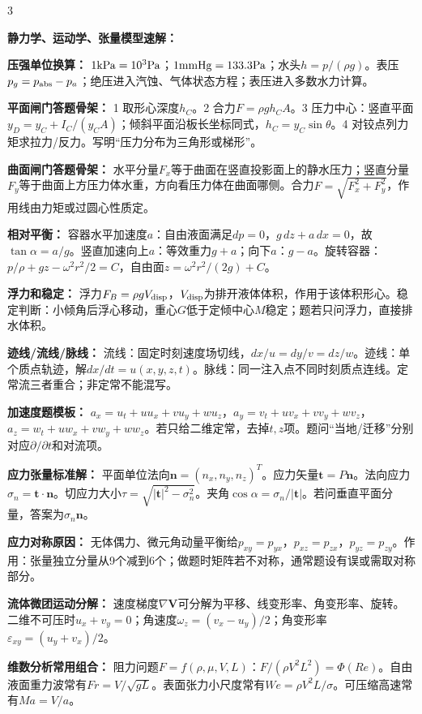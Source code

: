 \documentclass[a4paper]{article}
\newcommand{\sect}[1]{\par{\bfseries\color{Q}#1：}}
\begin{document}
\begin{multicols}{3}
{\sect{静力学、运动学、张量模型速解}
\sect{压强单位换算}
$1{\rm kPa}=10^3{\rm Pa}$；$1{\rm mmHg}=133.3{\rm Pa}$；水头$h=p/(\rho g)$。表压$p_g=p_{\rm abs}-p_a$；绝压进入汽蚀、气体状态方程；表压进入多数水力计算。
\sect{平面闸门答题骨架}
1 取形心深度$h_C$。2 合力$F=\rho gh_CA$。3 压力中心：竖直平面$y_D=y_C+I_C/(y_CA)$；倾斜平面沿板长坐标同式，$h_C=y_C\sin\theta$。4 对铰点列力矩求拉力/反力。写明“压力分布为三角形或梯形”。
\sect{曲面闸门答题骨架}
水平分量$F_x$等于曲面在竖直投影面上的静水压力；竖直分量$F_y$等于曲面上方压力体水重，方向看压力体在曲面哪侧。合力$F=\sqrt{F_x^2+F_y^2}$，作用线由力矩或过圆心性质定。
\sect{相对平衡}
容器水平加速度$a$：自由液面满足$dp=0$，$g\,dz+a\,dx=0$，故$\tan\alpha=a/g$。竖直加速向上$a$：等效重力$g+a$；向下$a$：$g-a$。旋转容器：$p/\rho+gz-\omega^2r^2/2=C$，自由面$z=\omega^2r^2/(2g)+C$。
\sect{浮力和稳定}
浮力$F_B=\rho gV_{\rm disp}$，$V_{\rm disp}$为排开液体体积，作用于该体积形心。稳定判断：小倾角后浮心移动，重心$G$低于定倾中心$M$稳定；题若只问浮力，直接排水体积。
\sect{迹线/流线/脉线}
流线：固定时刻速度场切线，$dx/u=dy/v=dz/w$。迹线：单个质点轨迹，解$dx/dt=u(x,y,z,t)$。脉线：同一注入点不同时刻质点连线。定常流三者重合；非定常不能混写。
\sect{加速度题模板}
$a_x=u_t+uu_x+vu_y+wu_z$，$a_y=v_t+uv_x+vv_y+wv_z$，$a_z=w_t+uw_x+vw_y+ww_z$。若只给二维定常，去掉$t,z$项。题问“当地/迁移”分别对应$\partial/\partial t$和对流项。
\sect{应力张量标准解}
平面单位法向$\bm n=(n_x,n_y,n_z)^T$。应力矢量$\bm t=P\bm n$。法向应力$\sigma_n=\bm t\cdot\bm n$。切应力大小$\tau=\sqrt{|\bm t|^2-\sigma_n^2}$。夹角$\cos\alpha=\sigma_n/|\bm t|$。若问垂直平面分量，答案为$\sigma_n\bm n$。
\sect{应力对称原因}
无体偶力、微元角动量平衡给$p_{xy}=p_{yx}$，$p_{xz}=p_{zx}$，$p_{yz}=p_{zy}$。作用：张量独立分量从9个减到6个；做题时矩阵若不对称，通常题设有误或需取对称部分。
\sect{流体微团运动分解}
速度梯度$\nabla\bm V$可分解为平移、线变形率、角变形率、旋转。二维不可压时$u_x+v_y=0$；角速度$\omega_z=(v_x-u_y)/2$；角变形率$\varepsilon_{xy}=(u_y+v_x)/2$。
\sect{维数分析常用组合}
阻力问题$F=f(\rho,\mu,V,L)$：$F/(\rho V^2L^2)=\Phi(Re)$。自由液面重力波常有$Fr=V/\sqrt{gL}$。表面张力小尺度常有$We=\rho V^2L/\sigma$。可压缩高速常有$Ma=V/a$。

}
\end{multicols}
\end{document}
